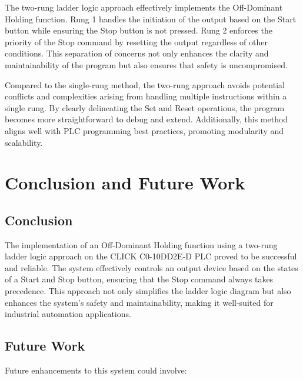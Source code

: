 \documentclass[12pt]{article}
\begin{document}
The two-rung ladder logic approach effectively implements the Off-Dominant Holding function. Rung 1 handles the initiation of the output based on the Start button while ensuring the Stop button is not pressed. Rung 2 enforces the priority of the Stop command by resetting the output regardless of other conditions. This separation of concerns not only enhances the clarity and maintainability of the program but also ensures that safety is uncompromised.

Compared to the single-rung method, the two-rung approach avoids potential conflicts and complexities arising from handling multiple instructions within a single rung. By clearly delineating the Set and Reset operations, the program becomes more straightforward to debug and extend. Additionally, this method aligns well with PLC programming best practices, promoting modularity and scalability.

\section{Conclusion and Future Work}

\subsection{Conclusion}

The implementation of an Off-Dominant Holding function using a two-rung ladder logic approach on the CLICK C0-10DD2E-D PLC proved to be successful and reliable. The system effectively controls an output device based on the states of a Start and Stop button, ensuring that the Stop command always takes precedence. This approach not only simplifies the ladder logic diagram but also enhances the system's safety and maintainability, making it well-suited for industrial automation applications.

\subsection{Future Work}

Future enhancements to this system could involve:
\end{document}
